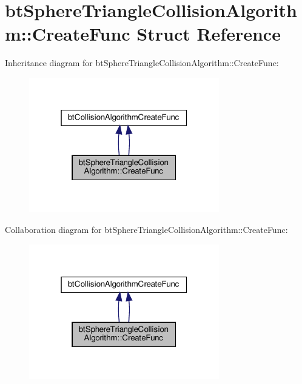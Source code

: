 \hypertarget{structbtSphereTriangleCollisionAlgorithm_1_1CreateFunc}{}\section{bt\+Sphere\+Triangle\+Collision\+Algorithm\+:\+:Create\+Func Struct Reference}
\label{structbtSphereTriangleCollisionAlgorithm_1_1CreateFunc}


Inheritance diagram for bt\+Sphere\+Triangle\+Collision\+Algorithm\+:\+:Create\+Func\+:
\nopagebreak
\begin{figure}[H]
\begin{center}
\leavevmode
\includegraphics[width=235pt]{structbtSphereTriangleCollisionAlgorithm_1_1CreateFunc__inherit__graph}
\end{center}
\end{figure}


Collaboration diagram for bt\+Sphere\+Triangle\+Collision\+Algorithm\+:\+:Create\+Func\+:
\nopagebreak
\begin{figure}[H]
\begin{center}
\leavevmode
\includegraphics[width=235pt]{structbtSphereTriangleCollisionAlgorithm_1_1CreateFunc__coll__graph}
\end{center}
\end{figure}
